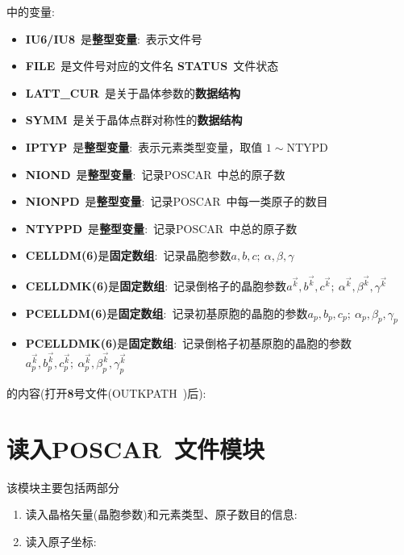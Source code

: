 \documentclass{article}      %
\begin{document}
中的变量:\\
\begin{itemize}
	\item \textbf{IU6/IU8}~是\textbf{整型变量}:~表示文件号
	\item \textbf{FILE}~是文件号对应的文件名\;\;\;\; \textbf{STATUS}~文件状态
	\item \textbf{LATT\_CUR}~是关于晶体参数的\textbf{数据结构}
	\item \textbf{SYMM}~是关于晶体点群对称性的\textbf{数据结构}
	\item \textbf{IPTYP}~是\textbf{整型变量}:~表示元素类型变量，取值 $1\sim\mathrm{NTYPD}$
	\item \textbf{NIOND}~是\textbf{整型变量}:~记录\textrm{POSCAR}~中总的原子数
	\item \textbf{NIONPD}~是\textbf{整型变量}:~记录\textrm{POSCAR}~中每一类原子的数目
	\item \textbf{NTYPPD}~是\textbf{整型变量}:~记录\textrm{POSCAR}~中总的原子数
	\item \textbf{CELLDM(6)}是\textbf{固定数组}:~记录晶胞参数$a,b,c;~\alpha,\beta,\gamma$
	\item \textbf{CELLDMK(6)}是\textbf{固定数组}:~记录倒格子的晶胞参数$a^{\vec k},b^{\vec k},c^{\vec k};~\alpha^{\vec k},\beta^{\vec k},\gamma^{\vec k}$
	\item \textbf{PCELLDM(6)}是\textbf{固定数组}:~记录初基原胞的晶胞的参数$a_p,b_p,c_p;~\alpha_p,\beta_p,\gamma_p$
	\item \textbf{PCELLDMK(6)}是\textbf{固定数组}:~记录倒格子初基原胞的晶胞的参数$a_p^{\vec k},b_p^{\vec k},c_p^{\vec k};~\alpha_p^{\vec k},\beta_p^{\vec k},\gamma_p^{\vec k}$
\end{itemize}

的内容(打开\textbf{8}号文件(\textrm{OUTKPATH~})后):~

\section{读入\bf{POSCAR~}文件模块}
该模块主要包括两部分
\begin{enumerate}
	\item 读入晶格矢量(晶胞参数)和元素类型、原子数目的信息:~
	\item 读入原子坐标:~
\end{enumerate}
\end{document}
